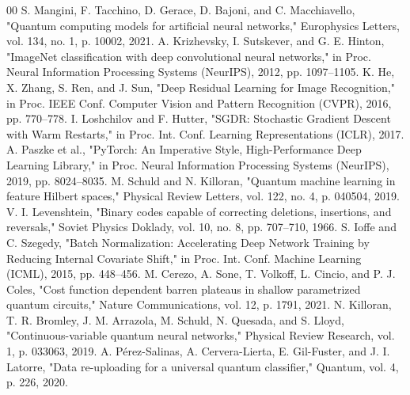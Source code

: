 \documentclass[preprint,12pt]{elsarticle}
\begin{document}
\begin{thebibliography}{00}
 S. Mangini, F. Tacchino, D. Gerace, D. Bajoni, and C. Macchiavello, "Quantum computing models for artificial neural networks," Europhysics Letters, vol. 134, no. 1, p. 10002, 2021.
 A. Krizhevsky, I. Sutskever, and G. E. Hinton, "ImageNet classification with deep convolutional neural networks," in Proc. Neural Information Processing Systems (NeurIPS), 2012, pp. 1097--1105.
 K. He, X. Zhang, S. Ren, and J. Sun, "Deep Residual Learning for Image Recognition," in Proc. IEEE Conf. Computer Vision and Pattern Recognition (CVPR), 2016, pp. 770--778.
 I. Loshchilov and F. Hutter, "SGDR: Stochastic Gradient Descent with Warm Restarts," in Proc. Int. Conf. Learning Representations (ICLR), 2017.
 A. Paszke et al., "PyTorch: An Imperative Style, High-Performance Deep Learning Library," in Proc. Neural Information Processing Systems (NeurIPS), 2019, pp. 8024--8035.
 M. Schuld and N. Killoran, "Quantum machine learning in feature Hilbert spaces," Physical Review Letters, vol. 122, no. 4, p. 040504, 2019.
 V. I. Levenshtein, "Binary codes capable of correcting deletions, insertions, and reversals," Soviet Physics Doklady, vol. 10, no. 8, pp. 707--710, 1966.
 S. Ioffe and C. Szegedy, "Batch Normalization: Accelerating Deep Network Training by Reducing Internal Covariate Shift," in Proc. Int. Conf. Machine Learning (ICML), 2015, pp. 448--456.
 M. Cerezo, A. Sone, T. Volkoff, L. Cincio, and P. J. Coles, "Cost function dependent barren plateaus in shallow parametrized quantum circuits," Nature Communications, vol. 12, p. 1791, 2021.
 N. Killoran, T. R. Bromley, J. M. Arrazola, M. Schuld, N. Quesada, and S. Lloyd, "Continuous-variable quantum neural networks," Physical Review Research, vol. 1, p. 033063, 2019.
 A. Pérez-Salinas, A. Cervera-Lierta, E. Gil-Fuster, and J. I. Latorre, "Data re-uploading for a universal quantum classifier," Quantum, vol. 4, p. 226, 2020.

\end{thebibliography}
\end{document}
